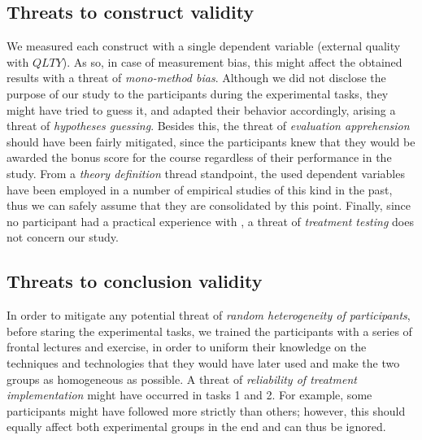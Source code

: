 \subsection{Threats to construct validity}
We measured each construct with a single dependent variable (\eg external quality with $QLTY$). As so, in case of measurement bias,
this might affect the obtained results with a threat of \textit{mono-method bias}. 
Although we did not disclose the purpose of our study to the participants during the experimental tasks, they might have tried to guess it, and adapted their behavior accordingly, arising a threat of \textit{hypotheses guessing}. 
Besides this, the threat of \textit{evaluation apprehension} should have been fairly mitigated, since the participants knew that they would be awarded the bonus score for the course regardless of their performance in the study.
From a \textit{theory definition} thread standpoint, the used dependent variables have been employed in a number of empirical studies of this kind in the past, thus we can safely assume that they are consolidated by this point. Finally, since no participant had a practical experience with \tdd, a threat of \textit{treatment testing} does not concern our study.

\subsection{Threats to conclusion validity}
In order to mitigate any potential threat of \textit{random heterogeneity of participants}, before staring the experimental tasks, we trained the participants with a series of frontal lectures and exercise, in order to uniform their knowledge on the techniques and technologies that they would have later used and make the two groups as homogeneous as possible. 
A threat of \textit{reliability of treatment implementation} might have occurred in tasks 1 and 2. For example, some participants might have followed \tdd more strictly than others; however, this should equally affect both experimental groups in the end and can thus be ignored. 
